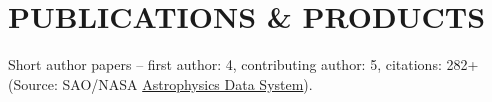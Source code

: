 
\section{PUBLICATIONS \& PRODUCTS}
Short author papers -- first author: 4, contributing author: 5, citations: 282+ (Source: SAO/NASA \href{https://ui.adsabs.harvard.edu/public-libraries/gHu-E7kETp2oguortiykaA}{Astrophysics Data System}). \\ %
\\
